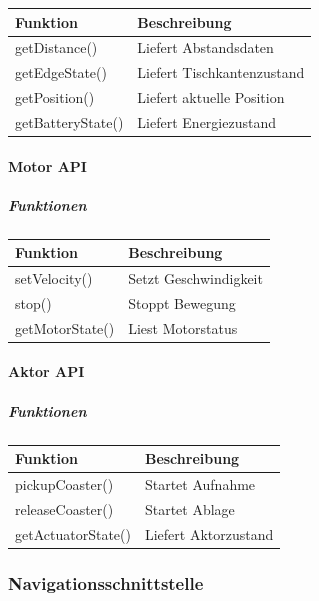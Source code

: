 \documentclass[
  a4paper,
  12pt,
  DIV=12,        %
  parskip=half,  %
  headings=small %
]{scrartcl}
\theoremstyle{definition}
\theoremstyle{definition}
\begin{document}
\begin{longtable}[]{@{}ll@{}}
\toprule\noalign{}
Funktion & Beschreibung \\
\midrule\noalign{}
\endhead
\bottomrule\noalign{}
\endlastfoot
getDistance() & Liefert Abstandsdaten \\
getEdgeState() & Liefert Tischkantenzustand \\
getPosition() & Liefert aktuelle Position \\
getBatteryState() & Liefert Energiezustand \\
\end{longtable}

\paragraph{Motor API}\label{motor-api}

\subparagraph{Funktionen}\label{funktionen-6}

\begin{longtable}[]{@{}ll@{}}
\toprule\noalign{}
Funktion & Beschreibung \\
\midrule\noalign{}
\endhead
\bottomrule\noalign{}
\endlastfoot
setVelocity() & Setzt Geschwindigkeit \\
stop() & Stoppt Bewegung \\
getMotorState() & Liest Motorstatus \\
\end{longtable}

\paragraph{Aktor API}\label{aktor-api}

\subparagraph{Funktionen}\label{funktionen-7}

\begin{longtable}[]{@{}ll@{}}
\toprule\noalign{}
Funktion & Beschreibung \\
\midrule\noalign{}
\endhead
\bottomrule\noalign{}
\endlastfoot
pickupCoaster() & Startet Aufnahme \\
releaseCoaster() & Startet Ablage \\
getActuatorState() & Liefert Aktorzustand \\
\end{longtable}

\subsubsection{Navigationsschnittstelle}\label{navigationsschnittstelle}
\end{document}
